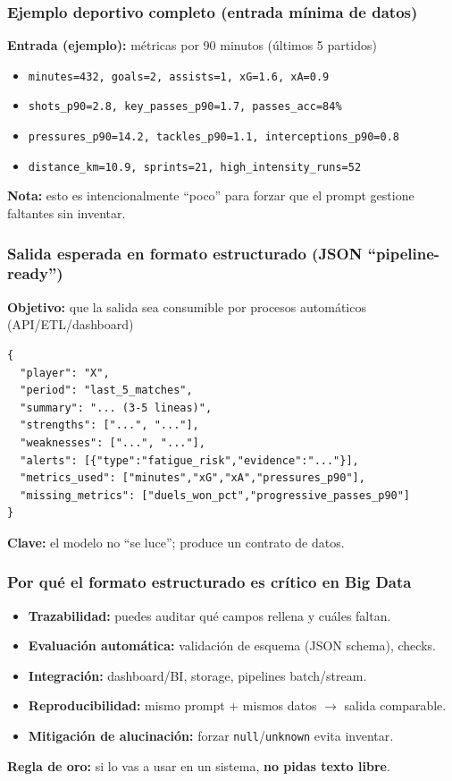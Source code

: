 \documentclass[aspectratio=169]{beamer}
\begin{document}
\begin{frame}\frametitle{Ejemplo deportivo completo (entrada mínima de datos)}
\textbf{Entrada (ejemplo):} métricas por 90 minutos (últimos 5 partidos)
\vspace{0.3em}

\begin{itemize}
    \item \texttt{minutes=432, goals=2, assists=1, xG=1.6, xA=0.9}
    \item \texttt{shots\_p90=2.8, key\_passes\_p90=1.7, passes\_acc=84\%}
    \item \texttt{pressures\_p90=14.2, tackles\_p90=1.1, interceptions\_p90=0.8}
    \item \texttt{distance\_km=10.9, sprints=21, high\_intensity\_runs=52}
\end{itemize}

\vspace{0.4em}
\textbf{Nota:} esto es intencionalmente “poco” para forzar que el prompt gestione faltantes sin inventar.
\end{frame}

\begin{frame}[fragile]\frametitle{Salida esperada en formato estructurado (JSON “pipeline-ready”)}
\textbf{Objetivo:} que la salida sea consumible por procesos automáticos (API/ETL/dashboard)

\vspace{0.4em}
\footnotesize
\begin{lstlisting}
{
  "player": "X",
  "period": "last_5_matches",
  "summary": "... (3-5 lineas)",
  "strengths": ["...", "..."],
  "weaknesses": ["...", "..."],
  "alerts": [{"type":"fatigue_risk","evidence":"..."}],
  "metrics_used": ["minutes","xG","xA","pressures_p90"],
  "missing_metrics": ["duels_won_pct","progressive_passes_p90"]
}
\end{lstlisting}
\normalsize

\vspace{0.2em}
\textbf{Clave:} el modelo no “se luce”; produce un contrato de datos.
\end{frame}

\begin{frame}\frametitle{Por qué el formato estructurado es crítico en Big Data}
\begin{itemize}
    \item \textbf{Trazabilidad:} puedes auditar qué campos rellena y cuáles faltan.
    \item \textbf{Evaluación automática:} validación de esquema (JSON schema), checks.
    \item \textbf{Integración:} dashboard/BI, storage, pipelines batch/stream.
    \item \textbf{Reproducibilidad:} mismo prompt + mismos datos $\rightarrow$ salida comparable.
    \item \textbf{Mitigación de alucinación:} forzar \texttt{null}/\texttt{unknown} evita inventar.
\end{itemize}

\vspace{0.3em}
\textbf{Regla de oro:} si lo vas a usar en un sistema, \textbf{no pidas texto libre}.
\end{frame}
\end{document}

